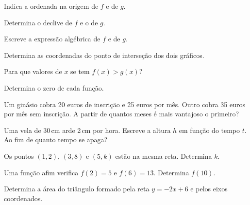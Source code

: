 \documentclass[12pt]{article}
\begin{document}

\begin{center}
\end{center}

\begin{exercicios}
  \item Indica a ordenada na origem de $f$ e de $g$.
  \item Determina o declive de $f$ e o de $g$.
  \item Escreve a expressão algébrica de $f$ e de $g$.
  \item Determina as coordenadas do ponto de interseção dos dois gráficos.
  \item Para que valores de $x$ se tem $f(x) > g(x)$?
  \item Determina o zero de cada função.
\end{exercicios}

\begin{exercicios}
  \item Um ginásio cobra 20 euros de inscrição e 25 euros por mês. Outro cobra 35 euros por mês sem inscrição. A partir de quantos meses é mais vantajoso o primeiro?
  \item Uma vela de 30\,cm arde 2\,cm por hora. Escreve a altura $h$ em função do tempo $t$. Ao fim de quanto tempo se apaga?
  \item Os pontos $(1, 2)$, $(3, 8)$ e $(5, k)$ estão na mesma reta. Determina $k$.
  \item Uma função afim verifica $f(2) = 5$ e $f(6) = 13$. Determina $f(10)$.
  \item Determina a área do triângulo formado pela reta $y = -2x + 6$ e pelos eixos coordenados.
\end{exercicios}
\end{document}
